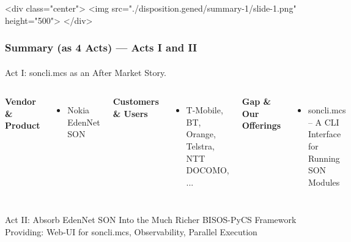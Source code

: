 \begin{htmlonly}

\begin{frame}[fragile,plain,label=summary-1]
    \frametitle{}
    \framesubtitle{}
    \begin{rawhtml}
<div class="center">
<img src="./disposition.gened/summary-1/slide-1.png" height="500">
</div>
    \end{rawhtml}
\end{frame}
\end{htmlonly}

\begin{verblatex}

\begin{frame}[fragile,plain,label=summary-1]
    \frametitle{Summary (as 4 Acts) --- Acts I and II}
    \framesubtitle{}

    \begin{exampleblock}{Act I: soncli.mcs as an After Market Story.}
    \end{exampleblock}

    \begin{columns}[T]

\textbf{Vendor \& Product}
\begin{itemize}
  \item Nokia EdenNet SON
\end{itemize}


\textbf{Customers \& Users}
\begin{itemize}
  \item T-Mobile, BT, Orange, Telstra, NTT DOCOMO, ...
\end{itemize}


\textbf{Gap \& Our Offerings}
\begin{itemize}
  \item soncli.mcs -- A CLI Interface for Running SON Modules
\end{itemize}

\end{columns}

      \begin{block}{Act II: Absorb EdenNet SON Into the Much Richer BISOS-PyCS Framework}
        Providing: Web-UI for soncli.mcs, Observability, Parallel Execution
      \end{block}


\end{frame}
\end{verblatex}
